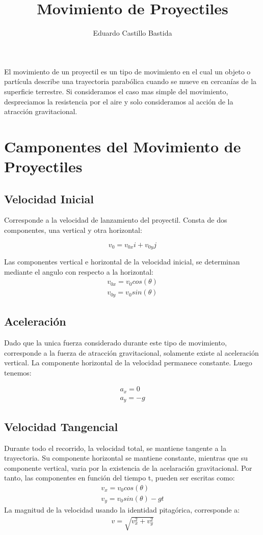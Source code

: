 \documentclass[12pt,a4paper]{article}
\title{\textbf{Movimiento de Proyectiles}}
\author{Eduardo Castillo Bastida}
\begin{document}
\maketitle
El movimiento de un proyectil es un tipo de movimiento en el cual un objeto o partícula describe una trayectoria parabólica cuando se mueve en cercanías de la superficie terrestre. Si consideramos el caso mas simple del movimiento, despreciamos la resistencia por el aire y solo consideramos al acción de la atracción gravitacional.
\section{\textbf{Camponentes del Movimiento de Proyectiles}}
\subsection{\textbf{Velocidad Inicial}}
Corresponde a la velocidad de lanzamiento del proyectil. Consta de dos componentes, una vertical y otra horizontal:

\begin{equation}
v_0=v_{0x}i+v_{0y}j
\end{equation}

Las componentes vertical e horizontal de la velocidad inicial, se determinan mediante el angulo con respecto a la horizontal:
\begin{eqnarray}
v_{0x}=v_{0}cos(\theta)\nonumber \\
v_{0y}=v_{0}sin(\theta)
\end{eqnarray}
\subsection{Aceleración}
Dado que la unica fuerza considerado durante este tipo de movimiento, corresponde a la fuerza de atracción gravitacional, solamente existe al aceleración vertical. La componente horizontal de la velocidad permanece constante. Luego tenemos:

\begin{eqnarray}
a_{x}=0\nonumber\\
a_{y}=-g
\end{eqnarray}

\subsection{Velocidad Tangencial}
Durante todo el recorrido, la velocidad total, se mantiene tangente a la trayectoria. Su componente horizontal se mantiene constante, mientras que su componente vertical, varia por la existencia de la acelaración gravitacional. Por tanto, las componentes en función del tiempo t, pueden ser escritas como:
\begin{eqnarray}
v_{x}=v_{0}cos(\theta) \nonumber\\
v_{y}=v_{0}sin(\theta)-gt 
\end{eqnarray}
La magnitud de la velocidad usando la identidad pitagórica, corresponde a:
\begin{eqnarray}
v=\sqrt{v_{x}^{2}+v_{y}^{2}}
\end{eqnarray}
\end{document}
